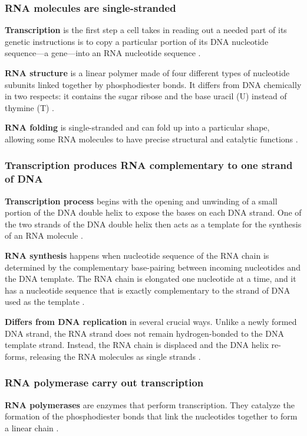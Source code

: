 \subsubsection*{RNA molecules are single-stranded}
\textbf{Transcription} is the first step a cell takes in reading out a needed part of its genetic instructions is to copy a particular portion of its DNA nucleotide sequence—a gene—into an RNA nucleotide sequence \cite*{L1-Chapter6}.

\textbf{RNA structure} is a linear polymer made of four different types of nucleotide subunits linked together by phosphodiester bonds. It differs from DNA chemically in two respects: it contains the sugar ribose and the base uracil (U) instead of thymine (T) \cite*{L1-Chapter6}.

\textbf{RNA folding} is single-stranded and can fold up into a particular shape, allowing some RNA molecules to have precise structural and catalytic functions \cite*{L1-Chapter6}.

\subsubsection*{Transcription produces RNA complementary to one strand of DNA}
\textbf{Transcription process} begins with the opening and unwinding of a small portion of the DNA double helix to expose the bases on each DNA strand. One of the two strands of the DNA double helix then acts as a template for the synthesis of an RNA molecule \cite*{L1-Chapter6}.

\textbf{RNA synthesis} happens when nucleotide sequence of the RNA chain is determined by the complementary base-pairing between incoming nucleotides and the DNA template. The RNA chain is elongated one nucleotide at a time, and it has a nucleotide sequence that is exactly complementary to the strand of DNA used as the template \cite*{L1-Chapter6}.

\textbf{Differs from DNA replication} in several crucial ways. Unlike a newly formed DNA strand, the RNA strand does not remain hydrogen-bonded to the DNA template strand. Instead, the RNA chain is displaced and the DNA helix re-forms, releasing the RNA molecules as single strands \cite*{L1-Chapter6}.

\subsubsection*{RNA polymerase carry out transcription}
\textbf{RNA polymerases} are enzymes that perform transcription. They catalyze the formation of the phosphodiester bonds that link the nucleotides together to form a linear chain \cite*{L1-Chapter6}.

